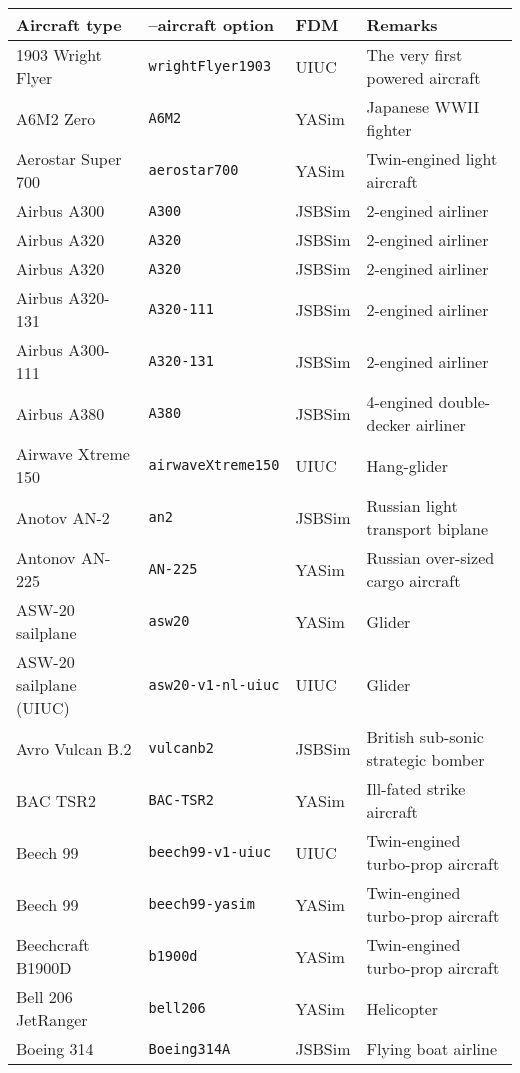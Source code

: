 \begin{tabular}{l|l|l|l}
Aircraft type       & --aircraft option & FDM    & Remarks\\\hline
   1903 Wright Flyer & \texttt{wrightFlyer1903} & UIUC & The very first powered aircraft\\
   A6M2 Zero        & \texttt{A6M2}       & YASim  &  Japanese WWII fighter\\
   Aerostar Super 700 & \texttt{aerostar700} & YASim & Twin-engined light aircraft\\
   Airbus A300      & \texttt{A300}       & JSBSim &  2-engined airliner \\
   Airbus A320      & \texttt{A320}       & JSBSim &  2-engined airliner \\
   Airbus A320      & \texttt{A320}       & JSBSim &  2-engined airliner \\
   Airbus A320-131  & \texttt{A320-111}   & JSBSim &  2-engined airliner \\
   Airbus A300-111  & \texttt{A320-131}   & JSBSim &  2-engined airliner \\
   Airbus A380      & \texttt{A380}       & JSBSim &  4-engined double-decker airliner \\
   Airwave Xtreme 150 & \texttt{airwaveXtreme150} & UIUC & Hang-glider \\
   Anotov AN-2 & \texttt{an2} & JSBSim & Russian light transport biplane\\
   Antonov AN-225   & \texttt{AN-225}     & YASim  &  Russian over-sized cargo aircraft\\
   ASW-20 sailplane & \texttt{asw20} & YASim & Glider\\
   ASW-20 sailplane (UIUC) & \texttt{asw20-v1-nl-uiuc} & UIUC & Glider\\
   Avro Vulcan B.2 & \texttt{vulcanb2} & JSBSim & British sub-sonic strategic bomber\\
   BAC TSR2         & \texttt{BAC-TSR2}   & YASim  &  Ill-fated strike aircraft\\
   Beech 99 & \texttt{beech99-v1-uiuc} & UIUC & Twin-engined turbo-prop aircraft\\
   Beech 99 & \texttt{beech99-yasim} & YASim & Twin-engined turbo-prop aircraft\\
   Beechcraft B1900D & \texttt{b1900d} & YASim & Twin-engined turbo-prop aircraft\\
   Bell 206 JetRanger & \texttt{bell206} & YASim & Helicopter\\
   Boeing 314       & \texttt{Boeing314A} & JSBSim &  Flying boat airline \\

\end{tabular}
